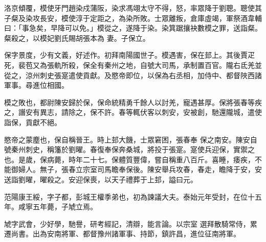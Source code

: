 \begin{pinyinscope}
 洛京傾覆，模使牙門趙染戍蒲阪，染求馮翊太守不得，怒，率眾降于劉聰。聰使其子粲及染攻長安，模使淳于定距之，為染所敗。士眾離叛，倉庫虛竭，軍祭酒韋輔曰：「事急矣，早降可以免。」模從之，遂降于染。染箕踞攘袂數模之罪，送詣粲。粲殺之，以模妃劉氏賜胡張本為
 妻。子保立。



 保字景度，少有文義，好述作。初拜南陽國世子。模遇害，保在邽上。其後賈疋死，裴苞又為張軌所殺，保全有秦州之地，自號大司馬，承制置百官。隴右氐羌並從之，涼州刺史張寔遣使貢獻。及愍帝即位，以保為右丞相，加侍中、都督陜西諸軍事。尋進位相國。



 模之敗也，都尉陳安歸於保，保命統精勇千餘人以討羌，寵遇甚厚。保將張春等疾之，譖安有異志，請除之，保不許。春等輒伏客以刺安，安被創，馳還隴城，遣使詣保，貢獻不絕。



 愍帝之蒙塵也，保自稱晉王。時上邽大饑，士眾窘困，張春奉
 保之南安。陳安自號秦州刺史，稱籓於劉曜。春復奉保奔桑城，將投于張寔。寔使兵迎保，實禦之也。是歲，保病薨，時年二十七。保體質豐偉，嘗自稱重八百斤。喜睡，痿疾，不能御婦人。無子，張春立宗室司馬瞻奉保後。陳安舉兵攻春，春走，瞻降于安，安送詣劉曜，曜殺之。安迎保喪，以天子禮葬于上邽，謚曰元。



 范陽康王綏，字子都，彭城王權季弟也，初為諫議大夫。泰始元年受封，在位十五年。咸寧五年薨，子虓立焉。



 虓字武會，少好學，馳譽，研考經記，清辯，能言論。以宗室
 選拜散騎常侍，累遷尚書。出為安南將軍、都督豫州諸軍事、持節，鎮許昌，進位征南將軍。




\end{pinyinscope}
